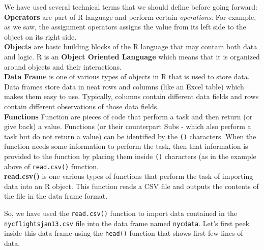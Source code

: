 \documentclass[11pt, letterpaper, twoside]{memoir}\usepackage{knitr}
\begin{document}
We have used several technical terms that we should define before going forward:\\
\textbf{Operators} are part of R language and perform certain \textit{operations}. For example, as we saw, the assignment operators assigns the value from its left side to the object on its right side.\\
\textbf{Objects} are basic building blocks of the R language that may contain both data and logic. R is an \textbf{Object Oriented Language} which means that it is organized around objects and their interactions.\\
\textbf{Data Frame} is one of various types of objects in R that is used to store data. Data frames store data in neat rows and columns (like an Excel table) which makes them easy to use. Typically, columns contain different data fields and rows contain different observations of those data fields.\\
\textbf{Functions} Function are pieces of code that perform a task and then return (or give back) a value. Functions (or their counterpart Subs - which also perform a task but do not return a value) can be identified by the \texttt{()} characters. When the function needs some information to perform the task, then that information is provided to the function by placing them inside \texttt{()} characters (as in the example above of \texttt{read.csv()} function.\\ 
\textbf{read.csv()} is one various types of functions that perform the task of importing data into an R object. This function reads a CSV file and outputs the contents of the file in the data frame format.

So, we have used the \texttt{read.csv()} function to import data contained in the \texttt{nycflightsjan13.csv} file into the data frame named \texttt{nycdata}. Let's first peek inside this data frame using the \texttt{head()}  function that shows first few lines of data.
\end{document}
